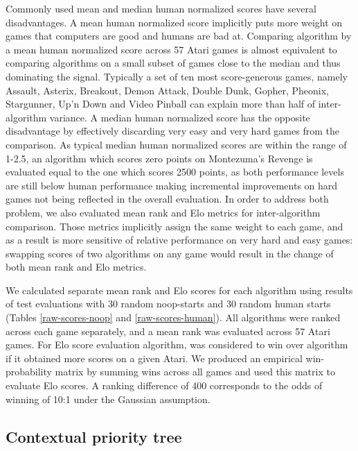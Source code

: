 \documentclass{article}
\begin{document}
Commonly used mean and median human normalized scores have several 
disadvantages. A mean human normalized score implicitly puts more weight on 
games that computers are good and humans are bad at. Comparing algorithm by a 
mean human normalized score across 57 Atari games is almost equivalent to 
comparing algorithms on a small subset of games close to the median 
and thus dominating the signal.
Typically a set of ten most score-generous games, namely Assault, Asterix, 
Breakout, Demon Attack, Double Dunk, Gopher, Pheonix, Stargunner, Up'n Down and 
Video Pinball can explain more than half of inter-algorithm variance. A median 
human normalized score has the opposite disadvantage by effectively discarding 
very easy and very hard games from the comparison. As typical median human 
normalized scores are within the range of 1-2.5, an algorithm which scores zero 
points on Montezuma's Revenge is evaluated equal to the one which scores 2500 
points, as both performance levels are still below human performance making 
incremental improvements on hard games not being reflected in the overall 
evaluation. In order to address both problem, we also evaluated mean rank and 
Elo metrics for inter-algorithm comparison. Those metrics implicitly assign the 
same weight to each game, and as a result is more sensitive of relative 
performance on very 
hard and easy games: swapping scores of two algorithms on any game would 
result in the change of both mean rank and Elo metrics.

We calculated separate mean rank and Elo scores for each algorithm using 
results of test evaluations with 30 random noop-starts and 30 random human 
starts (Tables \ref{raw-scores-noop} and \ref{raw-scores-human}).
All algorithms were ranked across each game separately, and a mean rank 
was evaluated across 57 Atari games. For Elo score 
evaluation algorithm,  was considered to win over algorithm  if 
it obtained more scores on a given Atari. We produced an empirical 
win-probability matrix by summing wins across all games and used this matrix to 
evaluate Elo scores. A ranking difference of 400 corresponds to the odds 
of winning of 10:1 under the Gaussian assumption.

\subsection{Contextual priority tree}
\label{app-tree-prioritized}
\end{document}
